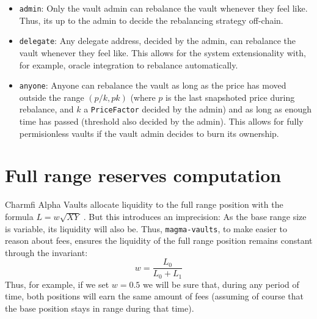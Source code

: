 \documentclass[11pt]{article}
\begin{document}
\begin{itemize}
    \item \texttt{admin}: Only the vault admin can rebalance the vault whenever they
        feel like. Thus, its up to the admin to decide the rebalancing strategy off-chain.
    \item \texttt{delegate}: Any delegate address, decided by the admin, can rebalance
        the vault whenever they feel like. This allows for the system extensionality with,
        for example, oracle integration to rebalance automatically.
    \item \texttt{anyone}: Anyone can rebalance the vault as long as the price
        has moved outside the range $(p/k, pk)$ (where $p$ is the last
        snapshoted price during rebalance, and $k$ a \texttt{PriceFactor}
        decided by the admin) and as long as enough time has passed (threshold also
        decided by the admin). This allows for fully permisionless vaults if the
        vault admin decides to burn its ownership.
\end{itemize}

\section{Full range reserves computation}
Charmfi Alpha Vaults allocate liquidity to the full range position with
the formula $L = w\sqrt{XY}$ \cite{charmfi-liquidity-computation}. But this
introduces an imprecision: As the base range size is variable, its liquidity
will also be. Thus, \texttt{magma-vaults}, to make easier to reason about fees,
ensures the liquidity of the full range position remains constant through the
invariant:
\[
w = \frac{L_0}{L_0 + L_1}
\]
Thus, for example, if we set $w = 0.5$ we will be sure that, during any period
of time, both positions will earn the same amount of fees (assuming of course that
the base position stays in range during that time).
\end{document}
